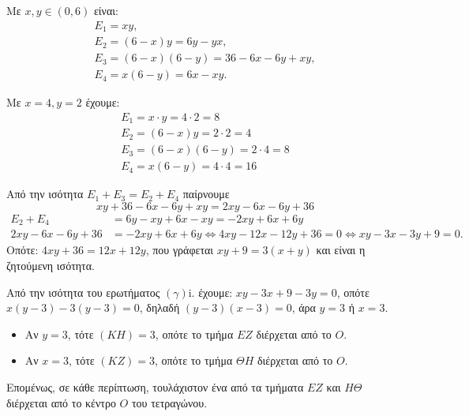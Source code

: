 
\begin{alist}
\item Με $x, y \in (0, 6)$ είναι:
\begin{gather*}
E_1 = xy, \\
E_2 = (6 - x)y = 6y - yx, \\
E_3 = (6 - x)(6 - y) = 36 - 6x - 6y + xy, \\
E_4 = x(6 - y) = 6x - xy.
\end{gather*}

\item Με $x = 4, y = 2$ έχουμε:
\begin{gather*}
E_1 = x \cdot y = 4 \cdot 2 = 8 \\
E_2 = (6 - x)y = 2 \cdot 2 = 4 \\
E_3 = (6 - x)(6 - y) = 2 \cdot 4 = 8 \\
E_4 = x(6 - y) = 4 \cdot 4 = 16
\end{gather*}

\item 
\begin{rlist}
\item Από την ισότητα $E_1 + E_3 = E_2 + E_4$ παίρνουμε
\[xy + 36 - 6x - 6y + xy = 2xy - 6x - 6y + 36\]
\begin{align*}
E_2+E_4 &= 6y - xy + 6x - xy = -2xy + 6x + 6y \\
2xy - 6x - 6y + 36 &= -2xy + 6x + 6y \Leftrightarrow 4xy - 12x - 12y + 36 = 0 \Leftrightarrow xy - 3x - 3y + 9 = 0.
\end{align*}
Οπότε: $4xy + 36 = 12x + 12y$, που γράφεται $xy + 9 = 3(x + y)$ και είναι η ζητούμενη ισότητα.

\item Από την ισότητα του ερωτήματος $(\gamma)$i. έχουμε:
$xy - 3x + 9 - 3y = 0$, οπότε $x(y - 3) - 3(y - 3) = 0$, δηλαδή $(y - 3)(x - 3) = 0$, άρα $y = 3$ ή $x = 3$.

\begin{itemize}
\item Αν $y = 3$, τότε $(KH) = 3$, οπότε το τμήμα $EZ$ διέρχεται από το $O$.
\item Αν $x = 3$, τότε $(KZ) = 3$, οπότε το τμήμα $\Theta H$ διέρχεται από το $O$.
\end{itemize}
Επομένως, σε κάθε περίπτωση, τουλάχιστον ένα από τα τμήματα $EZ$ και $H\Theta$ διέρχεται από το
κέντρο $O$ του τετραγώνου.
\end{rlist}
\end{alist}


